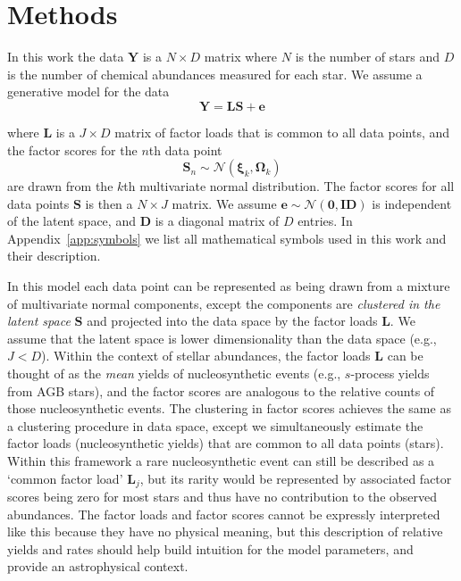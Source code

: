 \documentclass[twocolumn]{aastex61}
\newcommand{\vect}[1]{\boldsymbol{\mathbf{#1}}}
\renewcommand{\vec}[1]{\vect{#1}}
\newcommand{\data}{\textbf{Y}}
\newcommand{\vecdata}{\vec\data}
\newcommand{\eye}{\textbf{I}}
\newcommand{\factorloads}{\textbf{L}}
\newcommand{\factorscores}{\textbf{S}}
\newcommand{\specificvariance}{\vec{D}}
\newcommand{\NumData}{N}
\newcommand{\NumDimensions}{D}
\newcommand{\numdata}{n}
\newcommand{\NumLatentFactors}{J}
\newcommand{\numlatentfactors}{j}
\newcommand{\numcomponents}{k}
\begin{document}
\section{Methods} \label{sec:methods}



In this work the data $\vecdata$ is a $\NumData \times \NumDimensions$ matrix 
where $\NumData$ is the number of stars and $\NumDimensions$ is the number of
chemical abundances measured for each star. We assume a
generative model for the data 
\begin{equation}
	\vecdata = \factorloads\factorscores + \vec{e}
	\label{eq:generative-model}
\end{equation}

\noindent{}where $\factorloads$ is a $\NumLatentFactors \times \NumDimensions$ matrix of factor
loads that is common to all data points, and the factor scores for
the $\numdata$th data point
\begin{equation}
	\factorscores_\numdata \sim \mathcal{N}(\vec\xi_\numcomponents, \vec\Omega_\numcomponents)
\end{equation}
\noindent{}are drawn from the $\numcomponents$th multivariate  normal distribution.
The factor scores for all data points $\factorscores$ is then a 
$\NumData \times \NumLatentFactors$ matrix.
 We assume $\vec{e} \sim \mathcal{N}\left(\vec{0}, \eye\specificvariance\right)$
is independent of the latent space, and $\specificvariance$ is a
diagonal matrix of $\NumDimensions$ entries. In Appendix~\ref{app:symbols}
we list all mathematical symbols used in this work and their description.

In this model each data point can be represented as being drawn
from a mixture of multivariate normal components, except the components
are \emph{clustered in the latent space} $\factorscores$ and projected
into the data space by the factor loads $\factorloads$. 
We assume that the latent space is lower dimensionality than the
data space (e.g., $\NumLatentFactors < \NumDimensions$).
Within the context of stellar abundances, the factor loads
$\factorloads$ can be thought of as the \emph{mean} yields
of nucleosynthetic
events (e.g., $s$-process yields from AGB stars), and the
factor scores are analogous to the relative counts of those 
nucleosynthetic events. The clustering in factor scores
achieves the same as a clustering procedure in data space,
except we simultaneously estimate the factor loads
(nucleosynthetic yields) that are common to all data points 
(stars). Within this framework a rare nucleosynthetic event
can still be described as a `common factor load' $\factorloads_\numlatentfactors$, 
but its rarity would be represented by associated factor
scores being zero for most stars and thus have no contribution
to the observed abundances. The factor loads and factor scores 
cannot be expressly interpreted like this because they have no
physical meaning, but this description of relative yields and 
rates should help build intuition for the model parameters,
and provide an astrophysical context.
\end{document}
